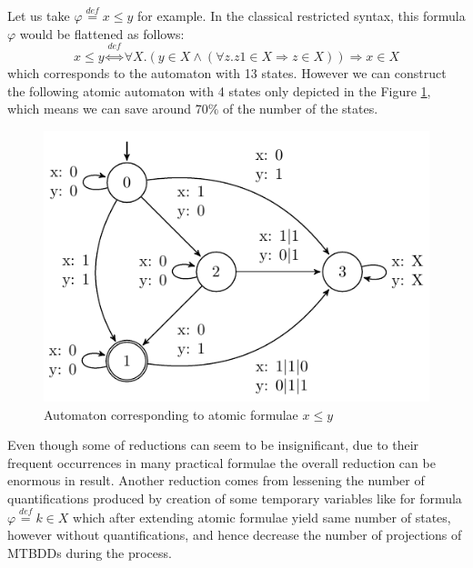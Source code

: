  \noindent\hrulefill
 \begin{example}
 Let us take $\varphi \overset{\mathit{def}}{=} x \leq y$ for example. In the
 classical restricted syntax, this formula $\varphi$ would be flattened as follows:
 \begin{equation}
  x \leq y \overset{\mathit{def}}{\Leftrightarrow} \forall X. (y \in X \wedge
  (\forall z.
  z1 \in X \Rightarrow z \in X)) \Rightarrow x \in X
 \end{equation} 
 which corresponds to the automaton with 13 states. However we can construct the
 following atomic automaton with 4 states only depicted in the Figure
 \ref{less-eq}, which means we can save around $70\%$ of the number of the
 states.
 \begin{figure}[h!]
 \begin{center}
  \includegraphics{fig/atomic-x-lesseq-y}
 \end{center}
 \caption{Automaton corresponding to atomic formulae $x \leq y$}\label{less-eq}
\end{figure}
 \end{example}
 \noindent\hrulefill
 \newpage
 Even though some of reductions can seem to be
 insignificant, due to their frequent occurrences in many practical formulae the
 overall reduction can be enormous in result. Another reduction comes from
 lessening the number of quantifications produced by creation of some temporary
 variables like for formula $\varphi \overset{\mathit{def}}{=} k \in X$ which
 after extending atomic formulae yield same number of states, however without
 quantifications, and hence decrease the number of projections of MTBDDs during
 the process.
 
